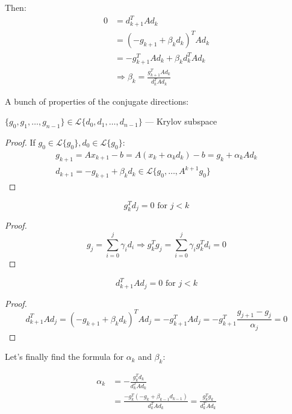 Then: 
\begin{align*}
    0 &= d^T_{k+1} A d_k \\ 
    &= (-g_{k+1} + \beta_k d_k)^T A d_k \\ 
    &= -g_{k+1}^T A d_k + \beta_k d_k^T A d_k \\
    &\Longrightarrow \beta_k = \frac{g_{k+1}^T A d_k}{d_k^T A d_k}
\end{align*}

A bunch of properties of the conjugate directions:

\begin{theorem}
    $\{g_0, g_1, \ldots, g_{n-1}\} \in \mathcal{L} \{ d_0, d_1, \ldots, d_{n-1} \}$ --- Krylov subspace
\end{theorem}
\begin{proof}
    If $g_0 \in \mathcal{L} \{g_0\}, d_0 \in \mathcal{L} \{g_0\}$: 
    \begin{gather*}
        g_{k+1} = A x_{k+1} - b = A (x_k + \alpha_k d_k) - b = g_k + \alpha_k A d_k \\ 
        d_{k+1} = -g_{k+1} + \beta_k d_k \in \mathcal{L} \{ g_0, \ldots, A^{k+1} g_0 \}
    \end{gather*}
\end{proof}

\begin{theorem}
    \[
        g_k^T d_j = 0 \text{ for } j < k
    \]
\end{theorem}
\begin{proof}
    \[ 
        g_j = \sum^{j}_{i=0} \gamma_i d_i \Longrightarrow g_k^T g_j = \sum^{j}_{i=0} \gamma_i g_k^T d_i = 0
    \]
\end{proof}

\begin{theorem}
    \[
        d_{k+1}^T A d_j = 0 \text{ for } j < k
    \]
\end{theorem}
\begin{proof}
    \[ 
        d_{k+1}^T A d_j = (-g_{k+1} + \beta_k d_k)^T A d_j = -g_{k+1}^T A d_j = -g_{k+1}^T \frac{g_{j+1} - g_j}{\alpha_j} = 0
    \]
\end{proof}

Let's finally find the formula for $\alpha_k$ and $\beta_k$: 

\begin{align*}
    \alpha_k &= - \frac{g_k^T d_k}{d_k^T A d_k} \\ 
    &= \frac{-g_k^T (-g_k + \beta_{k-1} d_{k-1})}{d_k^T A d_k}
    = \boxed{\frac{g_k^T g_k}{d_k^T A d_k}} \\ 
\end{align*}

